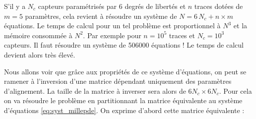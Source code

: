 \begin{appendices}
   S'il y a $N_c$ capteurs param\'etris\'es par $6$ degr\'es de libert\'es et $n$ traces dot\'ees de $m=5$ param\`etres, cela revient \`a r\'esoudre un syst\`eme de $N = 6 \, N_c + n \times m$ \'equations. Le temps de calcul pour un tel probl\`eme est proportionnel \`a $N^3$ et la m\'emoire consomm\'ee \`a $N^2$. Par exemple pour $n=10^5$ traces et $N_c = 10^3$ capteurs. Il faut r\'esoudre un syst\`eme de 506000 \'equations ! Le temps de calcul devient alors tr\`es \'elev\'e.
   
   \medskip
   
   Nous allons voir que gr\^ace aux propri\'et\'es de ce syst\`eme d'\'equations, on peut se ramener \`a l'inversion d'une matrice d\'ependant uniquement des param\`etres d'alignement. La taille de la matrice \`a inverser sera alors de $6N_c \times 6N_c$. Pour cela on va r\'esoudre le probl\`eme en partitionnant la matrice \'equivalente au syst\`eme d'\'equations \ref{eq:syst_millepde}. On exprime d'abord cette matrice \'equivalente :
   

\end{appendices}
